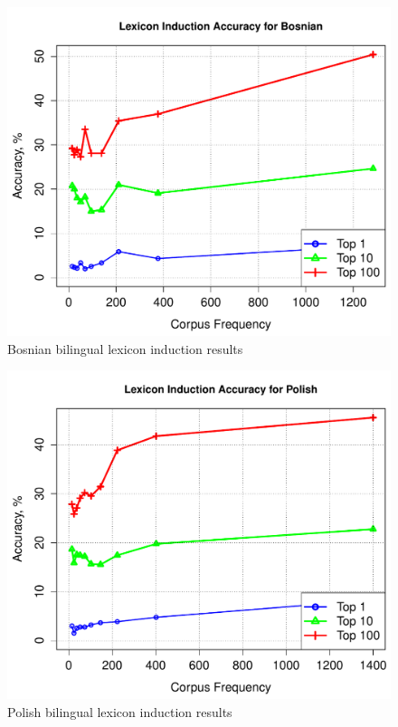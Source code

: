 \documentclass[11pt]{article}
\begin{document}
\clearpage

\begin{figure}
\begin{center}
\includegraphics[width=0.9 \linewidth]{../byFreqGraphs/bs/lexinductnew.pdf}
\vskip -0.15in
\caption{Bosnian bilingual lexicon induction results}
\label{fig:bli.bs} 
\end{center}
\end{figure}



\begin{figure}
\begin{center}
\includegraphics[width=0.9 \linewidth]{../byFreqGraphs/pl/lexinductnew.pdf}
\vskip -0.15in
\caption{Polish bilingual lexicon induction results}
\label{fig:bli.pl} 
\end{center}
\end{figure}
\end{document}
